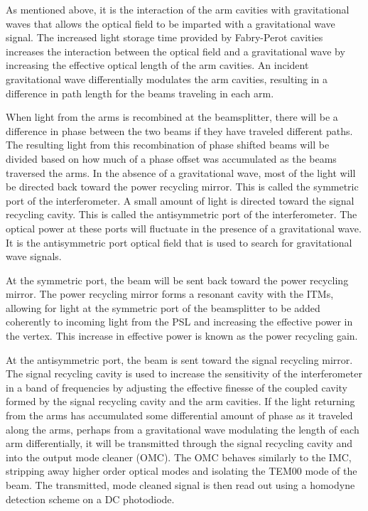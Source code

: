 As mentioned above, it is the interaction of the arm cavities with gravitational 
waves that allows the optical field to be imparted with a gravitational wave signal. 
The increased light storage time provided by Fabry-Perot cavities increases the 
interaction between the optical field and a gravitational wave by increasing 
the effective optical length of the arm cavities. 
An incident gravitational wave differentially modulates the arm cavities, resulting 
in a difference in path length for the beams traveling in each arm.  

When light
from the arms is recombined at the beamsplitter, there will be a difference
in phase between the two beams if they have traveled different paths. The 
resulting light from this recombination of phase shifted beams will 
be divided based on how much of a phase offset was accumulated as the 
beams traversed the arms. In the absence of a gravitational wave, most of the 
light will be directed back toward the power recycling mirror. This is called 
the symmetric port of the interferometer. A small amount of light is directed 
toward the signal recycling cavity. This is called the antisymmetric port of 
the interferometer. The optical power at these ports will fluctuate in the 
presence of a gravitational wave. It is the antisymmetric port optical field 
that is used to search for gravitational wave signals.

At the symmetric port, the beam 
will be sent back toward the power recycling mirror. The power recycling mirror 
forms a resonant cavity with the ITMs, allowing for light at the symmetric 
port of the beamsplitter to be added coherently to incoming light from the PSL and 
increasing the effective power in the vertex. This increase in effective power 
is known as the power recycling gain. 

At the antisymmetric port, the beam is sent toward the signal recycling mirror. 
The signal recycling cavity is used to increase the sensitivity of the 
interferometer in a band of frequencies by adjusting the effective finesse 
of the coupled cavity 
formed by the signal recycling cavity and the arm cavities. 
If the light returning from the arms has accumulated some differential amount of 
phase as it traveled 
along the arms, perhaps from a gravitational wave modulating the length of each 
arm differentially, it will be transmitted through the signal recycling cavity 
and into the output mode cleaner (OMC). The OMC behaves similarly to the IMC, 
stripping away higher order optical modes and isolating the TEM00 mode of the 
beam. The transmitted, mode cleaned signal is then read out using a homodyne 
detection scheme on a DC photodiode.

